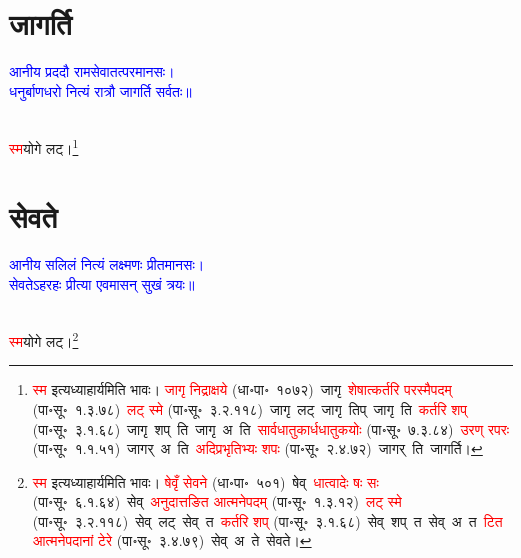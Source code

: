 \section[जागर्ति]{जागर्ति}
\centering\textcolor{blue}{आनीय प्रददौ रामसेवातत्परमानसः।\nopagebreak\\
धनुर्बाणधरो नित्यं रात्रौ जागर्ति सर्वतः॥}\nopagebreak\\
\\
\fontsize{14}{21}\selectfont\begin{sloppypar}\justifying\noindent\hspace{10mm} \textcolor{red}{स्म}\-योगे लट्।\footnote{\textcolor{red}{स्म} इत्यध्याहार्यमिति भावः। \textcolor{red}{जागृ निद्राक्षये} (धा॰पा॰~१०७२)~\arrow जागृ~\arrow \textcolor{red}{शेषात्कर्तरि परस्मैपदम्} (पा॰सू॰~१.३.७८)~\arrow \textcolor{red}{लट् स्मे} (पा॰सू॰~३.२.११८)~\arrow जागृ~लट्~\arrow जागृ~तिप्~\arrow जागृ~ति~\arrow \textcolor{red}{कर्तरि शप्‌} (पा॰सू॰~३.१.६८)~\arrow जागृ~शप्~ति~\arrow जागृ~अ~ति~\arrow \textcolor{red}{सार्वधातुकार्ध\-धातुकयोः} (पा॰सू॰~७.३.८४)~\arrow \textcolor{red}{उरण् रपरः} (पा॰सू॰~१.१.५१)~\arrow जागर्~अ~ति~\arrow \textcolor{red}{अदिप्रभृतिभ्यः शपः} (पा॰सू॰~२.४.७२)~\arrow जागर्~ति~\arrow जागर्ति।}\end{sloppypar}
\section[सेवते]{सेवते}
\centering\textcolor{blue}{आनीय सलिलं नित्यं लक्ष्मणः प्रीतमानसः।\nopagebreak\\
सेवतेऽहरहः प्रीत्या एवमासन् सुखं त्रयः॥}\nopagebreak\\
\\
\fontsize{14}{21}\selectfont\begin{sloppypar}\justifying\noindent\hspace{10mm} \textcolor{red}{स्म}\-योगे लट्।\footnote{\textcolor{red}{स्म} इत्यध्याहार्यमिति भावः। \textcolor{red}{षेवृँ सेवने} (धा॰पा॰~५०१)~\arrow षेव्~\arrow \textcolor{red}{धात्वादेः षः सः} (पा॰सू॰~६.१.६४)~\arrow सेव्~\arrow \textcolor{red}{अनुदात्तङित आत्मने\-पदम्} (पा॰सू॰~१.३.१२)~\arrow \textcolor{red}{लट् स्मे} (पा॰सू॰~३.२.११८)~\arrow सेव्~लट्~\arrow सेव्~त~\arrow \textcolor{red}{कर्तरि शप्‌} (पा॰सू॰~३.१.६८)~\arrow सेव्~शप्~त~\arrow सेव्~अ~त~\arrow \textcolor{red}{टित आत्मनेपदानां टेरे} (पा॰सू॰~३.४.७९)~\arrow सेव्~अ~ते~\arrow सेवते।}\end{sloppypar}
